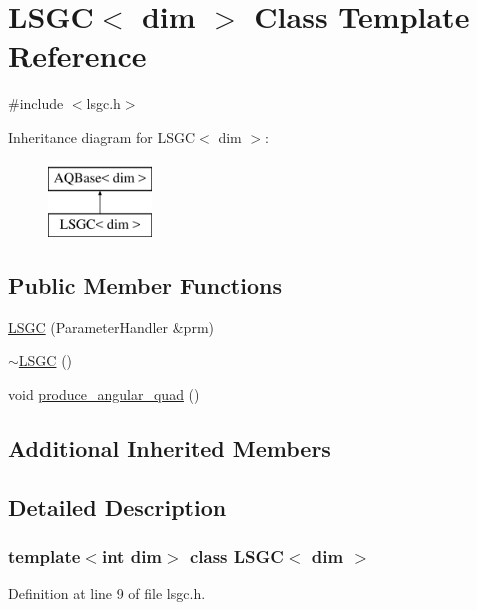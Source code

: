 \hypertarget{class_l_s_g_c}{}\section{L\+S\+GC$<$ dim $>$ Class Template Reference}
\label{class_l_s_g_c}


{\ttfamily \#include $<$lsgc.\+h$>$}

Inheritance diagram for L\+S\+GC$<$ dim $>$\+:\begin{figure}[H]
\begin{center}
\leavevmode
\includegraphics[height=2.000000cm]{class_l_s_g_c}
\end{center}
\end{figure}
\subsection*{Public Member Functions}
\begin{DoxyCompactItemize}
\item 
\hyperlink{class_l_s_g_c_a9b89f615563bd3583a4a6a36d7b3eb7d}{L\+S\+GC} (Parameter\+Handler \&prm)
\item 
\hyperlink{class_l_s_g_c_abcba8afdb075485278288db321776b7e}{$\sim$\+L\+S\+GC} ()
\item 
void \hyperlink{class_l_s_g_c_a1d135fb9ca12a9b65b8cc397479fc4d7}{produce\+\_\+angular\+\_\+quad} ()
\end{DoxyCompactItemize}
\subsection*{Additional Inherited Members}


\subsection{Detailed Description}
\subsubsection*{template$<$int dim$>$\newline
class L\+S\+G\+C$<$ dim $>$}



Definition at line 9 of file lsgc.\+h.



